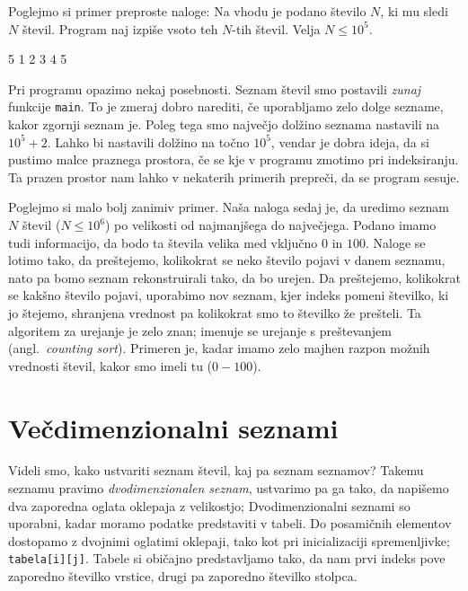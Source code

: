 \documentclass{book}
\begin{document}
\newpage
\begin{examples}
  Poglejmo si primer preproste naloge:
  Na vhodu je podano število $N$, ki mu sledi $N$ števil.
  Program naj izpiše vsoto teh $N$-tih števil.
  Velja $N \le 10^5$.
  \begin{inout}
	5
	1 2 3 4 5
  \end{inout}

  Pri programu opazimo nekaj posebnosti.
  Seznam števil smo postavili \emph{zunaj} funkcije \verb+main+.
  To je zmeraj dobro narediti, če uporabljamo zelo dolge sezname, kakor zgornji
  seznam je.
  Poleg tega smo največjo dolžino seznama nastavili na $10^5+2$.
  Lahko bi nastavili dolžino na točno $10^5$, vendar je dobra ideja, da si
  pustimo malce praznega prostora, če se kje v programu zmotimo pri indeksiranju.
  Ta prazen prostor nam lahko v nekaterih primerih prepreči, da se program sesuje.
\end{examples}

\begin{examples}
  Poglejmo si malo bolj zanimiv primer.
  Naša naloga sedaj je, da uredimo seznam $N$ števil ($N \le 10^6$) po velikosti
  od najmanjšega do največjega.
  Podano imamo tudi informacijo, da bodo ta števila velika med vključno $0$ in
  $100$.
  Naloge se lotimo tako, da preštejemo, kolikokrat se neko število pojavi v
  danem seznamu, nato pa bomo seznam rekonstruirali tako, da bo urejen.
  Da preštejemo, kolikokrat se kakšno število pojavi, uporabimo nov seznam, kjer
  indeks pomeni številko, ki jo štejemo, shranjena vrednost pa kolikokrat smo to
  številko že prešteli.
  Ta algoritem za urejanje je zelo znan; imenuje se urejanje s preštevanjem
  (angl.~\textit{counting sort}).
  Primeren je, kadar imamo zelo majhen razpon možnih vrednosti števil, kakor smo
  imeli tu ($0 - 100$).
\end{examples}

\section{Večdimenzionalni seznami}

Videli smo, kako ustvariti seznam števil, kaj pa seznam seznamov?
Takemu seznamu pravimo \textit{dvodimenzionalen seznam}, ustvarimo pa ga tako,
da napišemo dva zaporedna oglata oklepaja z velikostjo;
Dvodimenzionalni seznami so uporabni, kadar moramo podatke predstaviti v tabeli.
Do posamičnih elementov dostopamo z dvojnimi oglatimi oklepaji, tako kot pri
inicializaciji spremenljivke; \verb+tabela[i][j]+.
Tabele si običajno predstavljamo tako, da nam prvi indeks pove zaporedno
številko vrstice, drugi pa zaporedno številko stolpca.
\end{document}

